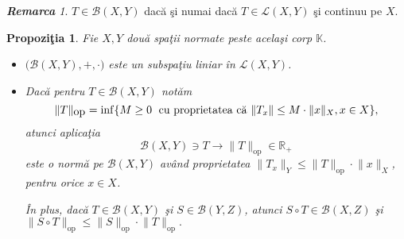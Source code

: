 \documentclass[ a4paper, 12pt]{report}
\newtheorem{prop}[theorem]{\bf Propozi\c tia }
\theoremstyle{definition}
\theoremstyle{remark}
\newtheorem{remarc}{\bf Remarca}[section]
\numberwithin{equation}{section}
\begin{document}
\begin{remarc}
$T \in \mathcal{B}(X,Y) $ dac\u a \c si numai dac\u a $T \in \mathcal{L}(X,Y)$ \c si continuu pe $X$.
\end{remarc}
\vspace{2cm}
\begin{prop} Fie $X, Y$ dou\u a spa\c tii normate peste acela\c si corp $\mathbb{K}$.
\begin{itemize}
\item[{\rm (a)}] $\Big(\mathcal{B}(X,Y), +, \cdot\Big)$ este un subspa\c tiu liniar \^in $\mathcal{L}(X,Y)$.

\item[{\rm (b)}] Dac\u a pentru $T \in \mathcal{B}(X,Y)$ not\u am
$$\lVert T \rVert_{\mbox{op}} = \inf \{ M \geq 0\; \hbox{ cu proprietatea c\u a }  \lVert T_x \rVert \leq M \cdot \lVert x \rVert_{X}, x \in X\},$$ atunci aplica\c tia
$$\mathcal{B}(X,Y) \ni T \longrightarrow \lVert T \rVert_{\mbox{op}} \in \mathbb{R}_+$$ este o norm\u a pe $\mathcal{B}(X,Y)$ av\^and proprietatea $\lVert T_x \rVert_{Y} \leq \lVert T \rVert_{\mbox{op}} \cdot \lVert x \rVert_{X}$, pentru orice $x \in X$.

\^In plus, dac\u a $T \in \mathcal{B}(X,Y)$ \c si $S \in \mathcal{B}(Y,Z)$, atunci $S \circ T \in \mathcal{B}(X,Z)$ \c si $\lVert S \circ T \rVert_{\mbox{op}} \leq \lVert S \rVert_{\mbox{op}} \cdot \lVert T \rVert_{\mbox{op}}.$
\end{itemize}
\end{prop}
\end{document}
